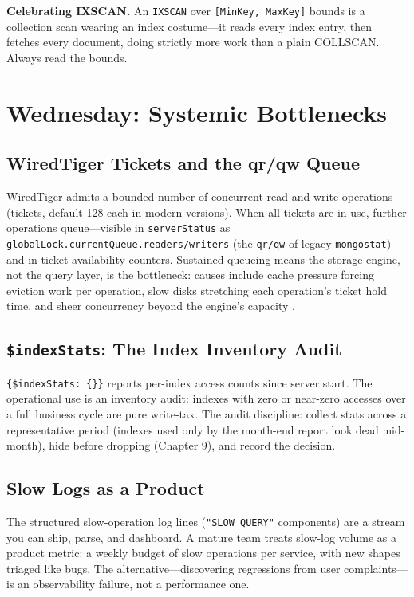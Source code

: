 \begin{pitfall}
\textbf{Celebrating IXSCAN.} An \texttt{IXSCAN} over \texttt{[MinKey, MaxKey]} bounds is a collection scan wearing an index costume---it reads every index entry, then fetches every document, doing strictly more work than a plain COLLSCAN. Always read the bounds.
\end{pitfall}

\section{Wednesday: Systemic Bottlenecks}
\subsection{WiredTiger Tickets and the qr/qw Queue}
WiredTiger admits a bounded number of concurrent read and write operations (tickets, default 128 each in modern versions). When all tickets are in use, further operations queue---visible in \texttt{serverStatus} as \texttt{globalLock.currentQueue.readers/writers} (the \texttt{qr/qw} of legacy \texttt{mongostat}) and in ticket-availability counters. Sustained queueing means the storage engine, not the query layer, is the bottleneck: causes include cache pressure forcing eviction work per operation, slow disks stretching each operation's ticket hold time, and sheer concurrency beyond the engine's capacity \cite{mongodbServerStatusDocs}.

\subsection{\texttt{\$indexStats}: The Index Inventory Audit}
\texttt{\{\$indexStats: \{\}\}} reports per-index access counts since server start. The operational use is an inventory audit: indexes with zero or near-zero accesses over a full business cycle are pure write-tax. The audit discipline: collect stats across a representative period (indexes used only by the month-end report look dead mid-month), hide before dropping (Chapter 9), and record the decision.

\subsection{Slow Logs as a Product}
The structured slow-operation log lines (\texttt{"SLOW QUERY"} components) are a stream you can ship, parse, and dashboard. A mature team treats slow-log volume as a product metric: a weekly budget of slow operations per service, with new shapes triaged like bugs. The alternative---discovering regressions from user complaints---is an observability failure, not a performance one.

